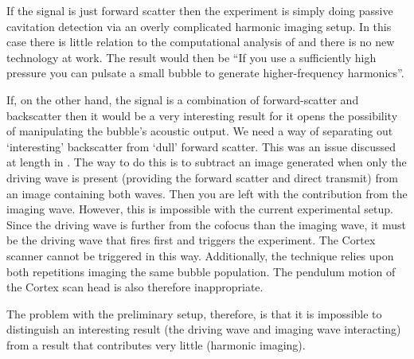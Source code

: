 {  If the signal is just forward scatter then the experiment is simply doing passive cavitation detection
  via an overly complicated harmonic imaging setup.
  In this case there is little relation to the computational analysis of 
  and there is no new technology at work.
  The result would then be ``If you use a sufficiently high pressure you can pulsate a small bubble  to generate higher-frequency harmonics''.

  If, on the other hand, the signal is a combination of forward-scatter and backscatter then it would be a very interesting result for it opens the possibility of manipulating the bubble's acoustic output.
  We need a way of separating out `interesting' backscatter from `dull' forward scatter.
  This was an issue discussed at length in .
  The way to do this is to subtract an image generated when only the driving wave is present (providing the forward scatter and direct transmit)
  from an image containing both waves.
  Then you are left with the contribution from the imaging wave.
  However, this is impossible with the current experimental setup.
  Since the driving wave is further from the cofocus than the imaging wave,
  it must be the driving wave that fires first and triggers the experiment.
  The Cortex scanner cannot be triggered in this way.
  Additionally, the technique relies upon both repetitions imaging the same bubble population.
  The pendulum motion of the Cortex scan head is also therefore  inappropriate.
}

 The problem with the preliminary setup, therefore,  is that it is impossible to distinguish an interesting result (the driving wave and imaging wave interacting)
 from a result that contributes very little (harmonic imaging).
 







%




